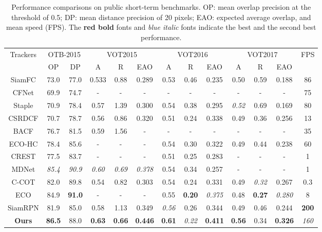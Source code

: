 \documentclass[runningheads]{llncs}
\newcommand\Tstrut{\rule{0pt}{2.6ex}}       \newcommand\Bstrut{\rule[-0.6ex]{0pt}{0pt}} \newcommand{\TBstrut}{\Tstrut\Bstrut} \renewcommand{\thefootnote}{}
\begin{document}
\begin{table}[t]

\centering
\caption{Performance comparisons on public short-term benchmarks. OP: mean overlap precision at the threshold of 0.5; DP: mean distance precision of 20 pixels; EAO: expected average overlap, and mean speed (FPS). The {\color{red}\textbf{red bold}} fonts and {\color{blue}\textit{blue italic}} fonts indicate the best and the second best performance.}
\label{tab:component}
\begin{tabular}{|c|cc|ccc|ccc|ccc|c|}
\hline
\multirow{2}{*}{Trackers} & \multicolumn{2}{c|}{OTB-2015} & \multicolumn{3}{c|}{VOT2015} & \multicolumn{3}{c|}{VOT2016} & \multicolumn{3}{c|}{VOT2017} & \multicolumn{1}{c|}{\multirow{2}{*}{FPS}} \TBstrut\\
\cline{2-12} & OP & DP & A & R & EAO & A & R & EAO & A & R & EAO&  \Tstrut\\ \hline\hline
SiamFC  & 73.0 & 77.0 & 0.533 & 0.88 & 0.289 & 0.53 & 0.46 & 0.235 & 0.50 & 0.59 & 0.188 & 86\Tstrut\\
CFNet   & 69.9 & 74.7 & - & - & - & - & - & - & - & - & - & 75\Tstrut\\
Staple  & 70.9 & 78.4 & 0.57 & 1.39 & 0.300 & 0.54 & 0.38 & 0.295 & \color{blue}\textit{0.52} & 0.69 & 0.169 & 80\Tstrut\\
CSRDCF  & 70.7 & 78.7 & 0.56 & 0.86 & 0.320 & 0.51 & 0.24 & 0.338 & 0.49 & 0.36 & 0.256 & 13\Tstrut\\
BACF    & 76.7 & 81.5 & 0.59 & 1.56 & - & - & - & - & - & - & - & 35\Tstrut\\
ECO-HC  & 78.4 & 85.6 & - & - & - & 0.54 & 0.30 & 0.322 & 0.49 & 0.44 & 0.238 & 60\Tstrut\\
\hline\hline
CREST  & 77.5 & 83.7 & - & - & - & 0.51 & 0.25 & 0.283 & - & - & - & 1\Tstrut\\
MDNet  & \color{blue}\textit{85.4} & \color{blue}\textit{90.9} & \color{blue}\textit{0.60} & \color{blue}\textit{0.69} & \color{blue}\textit{0.378} & 0.54 & 0.34 & 0.257 & - & - & - & 1\Tstrut\\
C-COT  & 82.0 & 89.8 & 0.54 & 0.82 & 0.303 & 0.54 & 0.24 & 0.331 & 0.49 & \color{blue}\textit{0.32} & 0.267 & 0.3\Tstrut\\
ECO    & 84.9 & \color{red}\textbf{91.0} & - & - & - & 0.55 & \color{red}\textbf{0.20} & \color{blue}\textit{0.375} & 0.48 & \color{red}\textbf{0.27} & \color{blue}\textit{0.280} & 8\Tstrut\\
\hline\hline
SiamRPN    & 81.9 & 85.0 & 0.58 & 1.13 & 0.349 & \color{blue}\textit{0.56} & 0.26 & 0.344 & 0.49 & 0.46 & 0.244 & {\color{red}\textbf{200}}\Tstrut\\
\textbf{Ours} & {\color{red}\textbf{86.5}} & 88.0 & \color{red}\textbf{0.63} & \color{red}\textbf{0.66} & \color{red}\textbf{0.446} & \color{red}\textbf{0.61} & \color{blue}\textit{0.22} & \color{red}\textbf{0.411} & \color{red}\textbf{0.56} & 0.34 & \color{red}\textbf{0.326} & {\color{blue}\textit{160}}\Tstrut\\
\hline
\end{tabular}

\end{table}
\end{document}
